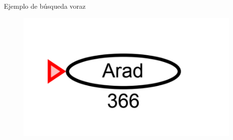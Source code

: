 \begin{frame}{Ejemplo de búsqueda voraz}
    \begin{figure}[t]
        \includegraphics[scale = 0.3]{4a_arad.png}
    \end{figure}
\end{frame}

